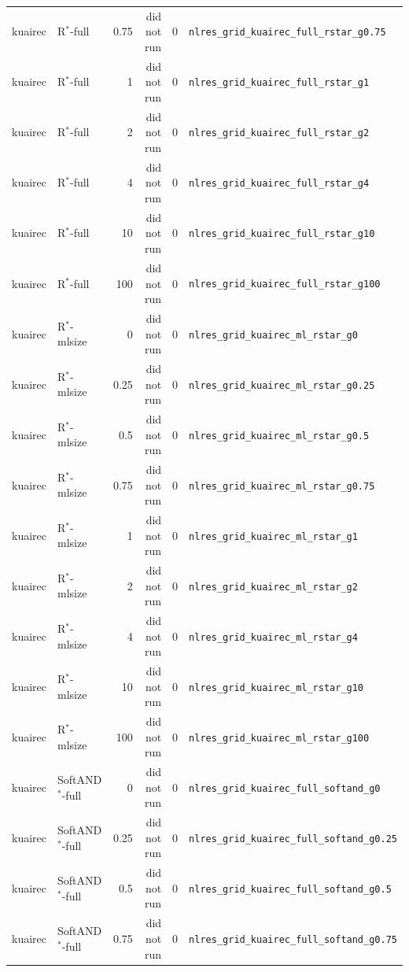 \documentclass[10pt,a4paper]{article}
\begin{document}
{\begin{longtable}{llrrll}
kuairec & R$^*$-full & 0.75 & did not run & 0 & \texttt{nlres\_grid\_kuairec\_full\_rstar\_g0.75} \\
kuairec & R$^*$-full & 1 & did not run & 0 & \texttt{nlres\_grid\_kuairec\_full\_rstar\_g1} \\
kuairec & R$^*$-full & 2 & did not run & 0 & \texttt{nlres\_grid\_kuairec\_full\_rstar\_g2} \\
kuairec & R$^*$-full & 4 & did not run & 0 & \texttt{nlres\_grid\_kuairec\_full\_rstar\_g4} \\
kuairec & R$^*$-full & 10 & did not run & 0 & \texttt{nlres\_grid\_kuairec\_full\_rstar\_g10} \\
kuairec & R$^*$-full & 100 & did not run & 0 & \texttt{nlres\_grid\_kuairec\_full\_rstar\_g100} \\
kuairec & R$^*$-mlsize & 0 & did not run & 0 & \texttt{nlres\_grid\_kuairec\_ml\_rstar\_g0} \\
kuairec & R$^*$-mlsize & 0.25 & did not run & 0 & \texttt{nlres\_grid\_kuairec\_ml\_rstar\_g0.25} \\
kuairec & R$^*$-mlsize & 0.5 & did not run & 0 & \texttt{nlres\_grid\_kuairec\_ml\_rstar\_g0.5} \\
kuairec & R$^*$-mlsize & 0.75 & did not run & 0 & \texttt{nlres\_grid\_kuairec\_ml\_rstar\_g0.75} \\
kuairec & R$^*$-mlsize & 1 & did not run & 0 & \texttt{nlres\_grid\_kuairec\_ml\_rstar\_g1} \\
kuairec & R$^*$-mlsize & 2 & did not run & 0 & \texttt{nlres\_grid\_kuairec\_ml\_rstar\_g2} \\
kuairec & R$^*$-mlsize & 4 & did not run & 0 & \texttt{nlres\_grid\_kuairec\_ml\_rstar\_g4} \\
kuairec & R$^*$-mlsize & 10 & did not run & 0 & \texttt{nlres\_grid\_kuairec\_ml\_rstar\_g10} \\
kuairec & R$^*$-mlsize & 100 & did not run & 0 & \texttt{nlres\_grid\_kuairec\_ml\_rstar\_g100} \\
kuairec & SoftAND$^*$-full & 0 & did not run & 0 & \texttt{nlres\_grid\_kuairec\_full\_softand\_g0} \\
kuairec & SoftAND$^*$-full & 0.25 & did not run & 0 & \texttt{nlres\_grid\_kuairec\_full\_softand\_g0.25} \\
kuairec & SoftAND$^*$-full & 0.5 & did not run & 0 & \texttt{nlres\_grid\_kuairec\_full\_softand\_g0.5} \\
kuairec & SoftAND$^*$-full & 0.75 & did not run & 0 & \texttt{nlres\_grid\_kuairec\_full\_softand\_g0.75} \\

\end{longtable}}
\end{document}

